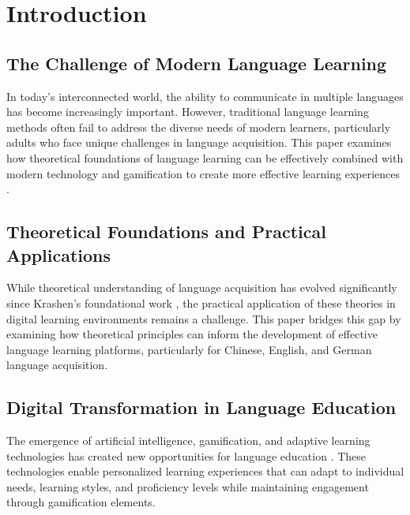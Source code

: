 \section{Introduction}
\subsection{The Challenge of Modern Language Learning}
In today's interconnected world, the ability to communicate in multiple languages has become increasingly important. However, traditional language learning methods often fail to address the diverse needs of modern learners, particularly adults who face unique challenges in language acquisition. This paper examines how theoretical foundations of language learning can be effectively combined with modern technology and gamification to create more effective learning experiences \citep{dörnyei2015psychology}.

\subsection{Theoretical Foundations and Practical Applications}
While theoretical understanding of language acquisition has evolved significantly since Krashen's foundational work \citep{krashen1982principles}, the practical application of these theories in digital learning environments remains a challenge. This paper bridges this gap by examining how theoretical principles can inform the development of effective language learning platforms, particularly for Chinese, English, and German language acquisition.

\subsection{Digital Transformation in Language Education}
The emergence of artificial intelligence, gamification, and adaptive learning technologies has created new opportunities for language education \citep{ai2023language}. These technologies enable personalized learning experiences that can adapt to individual needs, learning styles, and proficiency levels while maintaining engagement through gamification elements. 